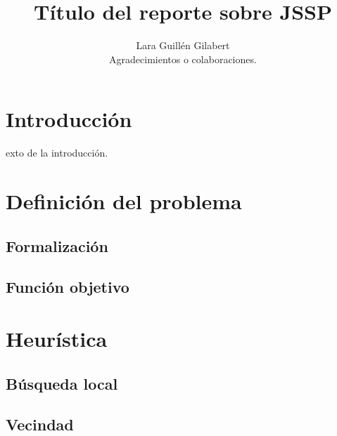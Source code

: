 \documentclass[9pt,a4paper,twocolumn,twoside]{tau-class/tau}
\title{T\'itulo del reporte sobre JSSP}
\author[]{Lara Guill\'en Gilabert\\

\small{Agradecimientos o colaboraciones.}}
\begin{document}
    \maketitle
    \thispagestyle{firststyle}


\section{Introducci\'on}

    exto de la introducci\'on.


\section{Definici\'on del problema}\label{sec:problema}

    \subsection{Formalizaci\'on}

    \subsection{Funci\'on objetivo}


\section{Heur\'istica}\label{sec:heuristica}

    \subsection{B\'usqueda local}

    \subsection{Vecindad}
\end{document}
